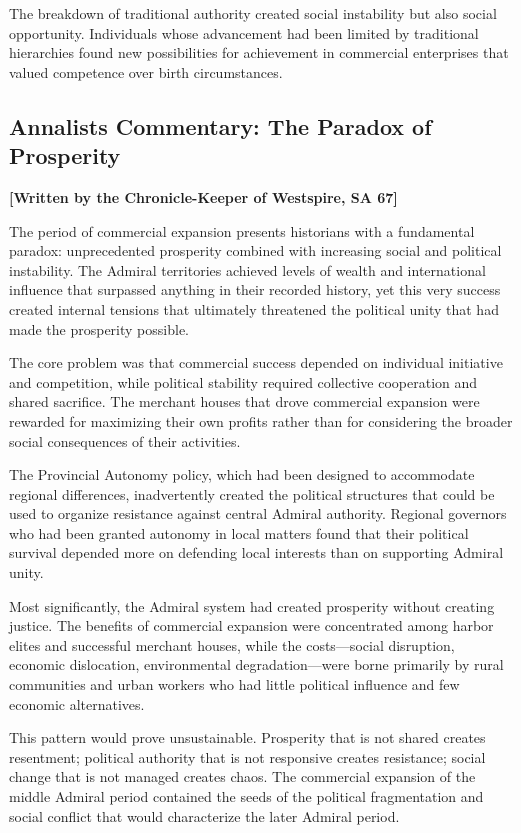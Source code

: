The breakdown of traditional authority created social instability but
also social opportunity. Individuals whose advancement had been limited
by traditional hierarchies found new possibilities for achievement in
commercial enterprises that valued competence over birth circumstances.

\subsection{Annalist\textquotesingle s Commentary: The Paradox of
Prosperity}\label{annalists-commentary-the-paradox-of-prosperity}

\textbf{{[}Written by the Chronicle-Keeper of Westspire, SA 67{]}}

The period of commercial expansion presents historians with a
fundamental paradox: unprecedented prosperity combined with increasing
social and political instability. The Admiral territories achieved
levels of wealth and international influence that surpassed anything in
their recorded history, yet this very success created internal tensions
that ultimately threatened the political unity that had made the
prosperity possible.

The core problem was that commercial success depended on individual
initiative and competition, while political stability required
collective cooperation and shared sacrifice. The merchant houses that
drove commercial expansion were rewarded for maximizing their own
profits rather than for considering the broader social consequences of
their activities.

The Provincial Autonomy policy, which had been designed to accommodate
regional differences, inadvertently created the political structures
that could be used to organize resistance against central Admiral
authority. Regional governors who had been granted autonomy in local
matters found that their political survival depended more on defending
local interests than on supporting Admiral unity.

Most significantly, the Admiral system had created prosperity without
creating justice. The benefits of commercial expansion were concentrated
among harbor elites and successful merchant houses, while the
costs---social disruption, economic dislocation, environmental
degradation---were borne primarily by rural communities and urban
workers who had little political influence and few economic
alternatives.

This pattern would prove unsustainable. Prosperity that is not shared
creates resentment; political authority that is not responsive creates
resistance; social change that is not managed creates chaos. The
commercial expansion of the middle Admiral period contained the seeds of
the political fragmentation and social conflict that would characterize
the later Admiral period.

